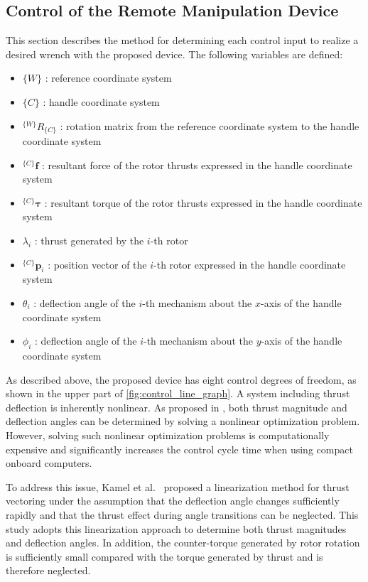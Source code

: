 \documentclass{WileyMSP-template}
\begin{document}
\subsection{Control of the Remote Manipulation Device}\label{sec:device_control}

This section describes the method for determining each control input to realize a desired wrench with the proposed device. The following variables are defined:

\begin{itemize}
  \item $\{W\}$ : reference coordinate system  
  \item $\{C\}$ : handle coordinate system  
  \item $^{\{W\}}R_{\{C\}}$ : rotation matrix from the reference coordinate system to the handle coordinate system  
  \item $^{\{C\}}\bm{f}$ : resultant force of the rotor thrusts expressed in the handle coordinate system  
  \item $^{\{C\}}\bm{\tau}$ : resultant torque of the rotor thrusts expressed in the handle coordinate system  
  \item $\lambda_i$ : thrust generated by the $i$-th rotor  
  \item $^{\{C\}}\bm{p}_i$ : position vector of the $i$-th rotor expressed in the handle coordinate system  
  \item $\theta_i$ : deflection angle of the $i$-th mechanism about the $x$-axis of the handle coordinate system  
  \item $\phi_i$ : deflection angle of the $i$-th mechanism about the $y$-axis of the handle coordinate system  
\end{itemize}

As described above, the proposed device has eight control degrees of freedom, as shown in the upper part of \ref{fig:control_line_graph}. 
A system including thrust deflection is inherently nonlinear. As proposed in \cite{nishio}, both thrust magnitude and deflection angles can be determined by solving a nonlinear optimization problem. 
However, solving such nonlinear optimization problems is computationally expensive and significantly increases the control cycle time when using compact onboard computers.

To address this issue, Kamel et al.~\cite{kamel} proposed a linearization method for thrust vectoring under the assumption that the deflection angle changes sufficiently rapidly and that the thrust effect during angle transitions can be neglected. 
This study adopts this linearization approach to determine both thrust magnitudes and deflection angles. 
In addition, the counter-torque generated by rotor rotation is sufficiently small compared with the torque generated by thrust and is therefore neglected.
\end{document}
